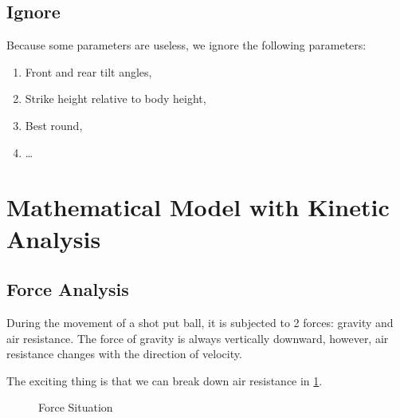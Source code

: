 \documentclass{article}
\begin{document}
\subsection{Ignore}

\label{subsection:ignore}

Because some parameters are useless, we ignore the following parameters:

\begin{enumerate}
    \item Front and rear tilt angles,
    \item Strike height relative to body height,
    \item Best round,
    \item \dots
\end{enumerate}

\section{Mathematical Model with Kinetic Analysis}

\label{section:mathematics-model}

\subsection{Force Analysis}

\label{subsection:force-analysis}

During the movement of a shot put ball, it is subjected to 2 forces: gravity and air resistance. The force of gravity is always vertically downward, however, air resistance changes with the direction of velocity.

The exciting thing is that we can break down air resistance in \ref{fig:force-situation}.

\begin{figure}[H]
    \centering
    \caption{Force Situation}
    \label{fig:force-situation}
\end{figure}
\end{document}
